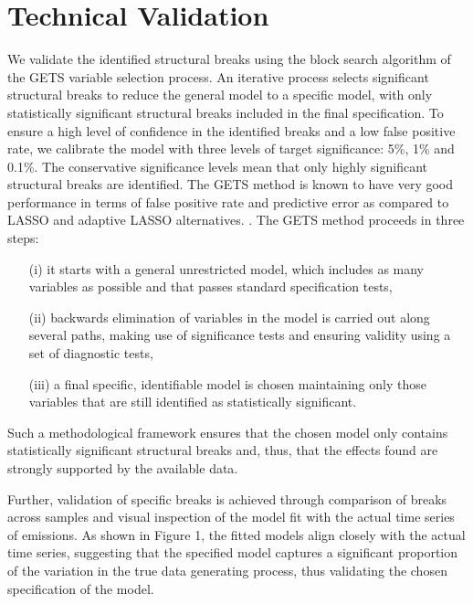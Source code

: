 \documentclass[a4paper]{article}
\begin{document}

\section*{Technical Validation}

We validate the identified structural breaks using the block search algorithm of the GETS variable selection process. An iterative process selects significant structural breaks to reduce the general model to a specific model, with only statistically significant structural breaks included in the final specification. To ensure a high level of confidence in the identified breaks and a low false positive rate, we calibrate the model with three levels of target significance: 5\%, 1\% and 0.1\%. The conservative significance levels mean that only highly significant structural breaks are identified. The GETS method is known to have very good performance in terms of false positive rate and predictive error as compared to LASSO and adaptive LASSO alternatives. \cite{pretis2018automated}. The GETS method proceeds in three steps: 
\begin{itemize}
    \item[(i)] it starts with a general unrestricted model, which includes as many variables as possible and that passes standard specification tests,
    \item[(ii)] backwards elimination of variables in the model is carried out along several paths, making use of significance tests and ensuring validity using a set of diagnostic tests,
    \item[(iii)] a final specific, identifiable model is chosen maintaining only those variables that are still identified as statistically significant.
\end{itemize}  

Such a methodological framework ensures that the chosen model only contains statistically significant structural breaks and, thus, that the effects found are strongly supported by the available data.

Further, validation of specific breaks is achieved through comparison of breaks across samples and visual inspection of the model fit with the actual time series of emissions. As shown in Figure 1, the fitted models align closely with the actual time series, suggesting that the specified model captures a significant proportion of the variation in the true data generating process, thus validating the chosen specification of the model.
\end{document}
